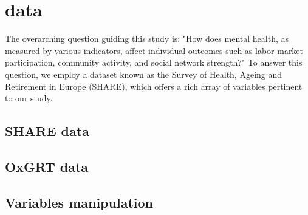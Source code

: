 \chapter{data}

The overarching question guiding this study is: "How does mental health, as measured by various indicators, affect individual outcomes such as labor market participation, community activity, and social network strength?" To answer this question, we employ a dataset known as the Survey of Health, Ageing and Retirement in Europe (SHARE), which offers a rich array of variables pertinent to our study.

\section{SHARE data}


\section{OxGRT data}

\section{Variables manipulation}


